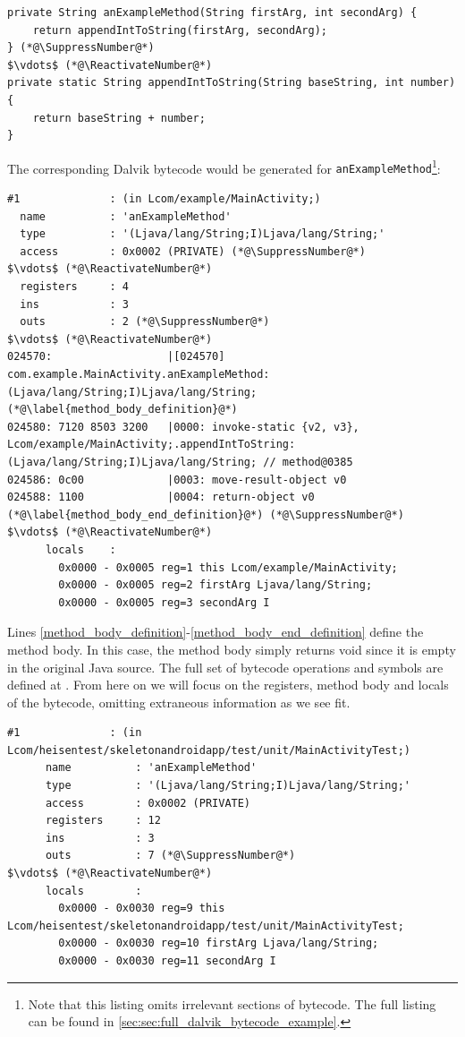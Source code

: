 \begin{lstlisting}[mathescape, numberblanklines=false]
private String anExampleMethod(String firstArg, int secondArg) {
    return appendIntToString(firstArg, secondArg);
} (*@\SuppressNumber@*)
$\vdots$ (*@\ReactivateNumber@*)
private static String appendIntToString(String baseString, int number) {
    return baseString + number;
}
\end{lstlisting}

The corresponding Dalvik bytecode would be generated for {\tt anExampleMethod}\footnote{Note that this listing omits irrelevant
sections of bytecode. The full listing can be found in
\autoref{sec:sec:full_dalvik_bytecode_example}.}:

\begin{lstlisting}[mathescape,numberblanklines=false]
#1              : (in Lcom/example/MainActivity;)
  name          : 'anExampleMethod'
  type          : '(Ljava/lang/String;I)Ljava/lang/String;'
  access        : 0x0002 (PRIVATE) (*@\SuppressNumber@*)
$\vdots$ (*@\ReactivateNumber@*)
  registers     : 4
  ins           : 3
  outs          : 2 (*@\SuppressNumber@*)
$\vdots$ (*@\ReactivateNumber@*)
024570:                  |[024570] com.example.MainActivity.anExampleMethod:(Ljava/lang/String;I)Ljava/lang/String; (*@\label{method_body_definition}@*)
024580: 7120 8503 3200   |0000: invoke-static {v2, v3}, Lcom/example/MainActivity;.appendIntToString:(Ljava/lang/String;I)Ljava/lang/String; // method@0385
024586: 0c00             |0003: move-result-object v0
024588: 1100             |0004: return-object v0 (*@\label{method_body_end_definition}@*) (*@\SuppressNumber@*)
$\vdots$ (*@\ReactivateNumber@*)
      locals    :
        0x0000 - 0x0005 reg=1 this Lcom/example/MainActivity;
        0x0000 - 0x0005 reg=2 firstArg Ljava/lang/String;
        0x0000 - 0x0005 reg=3 secondArg I
\end{lstlisting}

Lines \ref{method_body_definition}-\ref{method_body_end_definition} define the
method body. In this case, the method body simply returns void since it is empty
in the original Java source. The full set of bytecode operations and symbols are
defined at \cite{dalvikBytecode}. From here on we will focus on the
registers, method body and locals of the bytecode, omitting extraneous
information as we see fit.

\begin{lstlisting}[label=instrumented_example]
    #1              : (in Lcom/heisentest/skeletonandroidapp/test/unit/MainActivityTest;)
      name          : 'anExampleMethod'
      type          : '(Ljava/lang/String;I)Ljava/lang/String;'
      access        : 0x0002 (PRIVATE)
      registers     : 12
      ins           : 3
      outs          : 7 (*@\SuppressNumber@*)
$\vdots$ (*@\ReactivateNumber@*)
      locals        :
        0x0000 - 0x0030 reg=9 this Lcom/heisentest/skeletonandroidapp/test/unit/MainActivityTest;
        0x0000 - 0x0030 reg=10 firstArg Ljava/lang/String;
        0x0000 - 0x0030 reg=11 secondArg I
\end{lstlisting}

